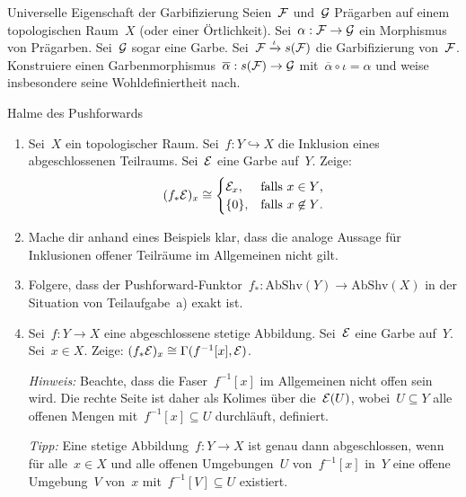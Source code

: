 \documentclass{uebblatt}
\begin{document}

\begin{aufgabe}{Universelle Eigenschaft der Garbifizierung}
Seien~$\mathcal{F}$ und~$\mathcal{G}$ Prägarben auf einem topologischen Raum~$X$ (oder einer
Örtlichkeit). Sei~$\alpha : \mathcal{F} \to \mathcal{G}$ ein Morphismus von Prägarben. Sei~$\mathcal{G}$
sogar eine Garbe. Sei~$\mathcal{F} \xrightarrow{\iota} s(\mathcal{F})$ die Garbifizierung von~$\mathcal{F}$.
Konstruiere einen Garbenmorphismus~$\overline{\alpha} : s(\mathcal{F}) \to \mathcal{G}$
mit~$\overline{\alpha} \circ \iota = \alpha$ und weise insbesondere seine
Wohldefiniertheit nach.
\end{aufgabe}

\begin{aufgabe}{Halme des Pushforwards}
\begin{enumerate}
\item Sei~$X$ ein topologischer Raum. Sei~$f : Y \hookrightarrow X$ die
Inklusion eines abgeschlossenen Teilraums. Sei~$\mathcal{E}$ eine Garbe auf~$Y$. Zeige:
\[ (f_* \mathcal{E})_x \cong \begin{cases}
  \mathcal{E}_x, & \text{falls $x \in Y$,} \\
  \{0\}, & \text{falls $x \not\in Y$.}
\end{cases} \]
\item Mache dir anhand eines Beispiels klar, dass die analoge Aussage für
Inklusionen offener Teilräume im Allgemeinen nicht gilt.
\item Folgere, dass der Pushforward-Funktor~$f_* : \mathrm{AbShv}(Y) \to
\mathrm{AbShv}(X)$ in der Situation von Teilaufgabe~a) exakt ist.
\item Sei~$f : Y \to X$ eine abgeschlossene stetige Abbildung. Sei~$\mathcal{E}$ eine
Garbe auf~$Y$. Sei~$x \in X$. Zeige: $(f_* \mathcal{E})_x \cong \Gamma(f^{-1}[x], \mathcal{E})$.

\emph{Hinweis:} Beachte, dass die Faser~$f^{-1}[x]$ im Allgemeinen nicht offen
sein wird. Die rechte Seite ist daher als Kolimes über die~$\mathcal{E}(U)$, wobei~$U
\subseteq Y$ alle offenen Mengen mit~$f^{-1}[x] \subseteq U$ durchläuft,
definiert.

\emph{Tipp:} Eine stetige Abbildung~$f : Y \to X$ ist genau dann abgeschlossen,
wenn für alle~$x \in X$ und alle offenen Umgebungen~$U$ von~$f^{-1}[x]$ in~$Y$
eine offene Umgebung~$V$ von~$x$ mit~$f^{-1}[V] \subseteq U$ existiert.
\end{enumerate}
\end{aufgabe}
\end{document}
